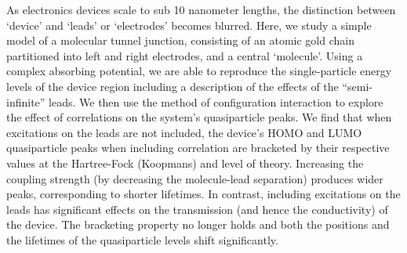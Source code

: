 As electronics devices scale to sub 10 nanometer lengths, the distinction
between `device' and `leads' or `electrodes' becomes blurred.
Here, we study a simple model of a molecular tunnel junction, consisting
of an atomic gold chain partitioned into left and right electrodes, and a
central `molecule'.
Using a complex absorbing potential, we are able to reproduce the
single-particle energy levels of the device region including a description
of the effects of the ``semi-infinite'' leads.
We then use the method of configuration interaction to explore the effect
of correlations on the system's quasiparticle peaks.
We find that when excitations on the leads are not included, the device's
\ac{HOMO} and \ac{LUMO} quasiparticle peaks when including correlation
are bracketed by their respective values at the Hartree-Fock (Koopmans)
and \dscf level of theory.
Increasing the coupling strength (by decreasing the molecule-lead
separation) produces wider peaks, corresponding to shorter lifetimes.
In contrast, including excitations on the leads has significant effects
on the transmission (and hence the conductivity) of the device. The
bracketing property no longer holds and both the positions and the lifetimes
of the quasiparticle levels shift significantly.
